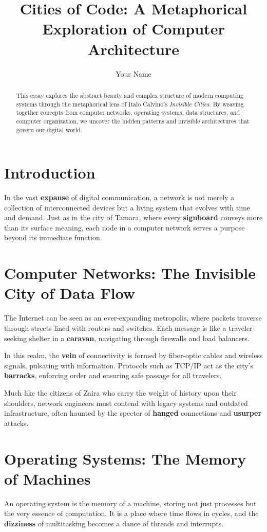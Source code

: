 \documentclass[12pt]{article}
\title{\textbf{Cities of Code: A Metaphorical Exploration of Computer Architecture}}
\author{Your Name}
\date{}
\begin{document}
	
	\maketitle
	
	\begin{abstract}
		This essay explores the abstract beauty and complex structure of modern computing systems through the metaphorical lens of Italo Calvino’s \textit{Invisible Cities}. By weaving together concepts from computer networks, operating systems, data structures, and computer organization, we uncover the hidden patterns and invisible architectures that govern our digital world.
	\end{abstract}
	
	\section{Introduction}
	In the vast \textbf{expanse} of digital communication, a network is not merely a collection of interconnected devices but a living system that evolves with time and demand. Just as in the city of Tamara, where every \textbf{signboard} conveys more than its surface meaning, each node in a computer network serves a purpose beyond its immediate function.
	
	\section{Computer Networks: The Invisible City of Data Flow}
	The Internet can be seen as an ever-expanding metropolis, where packets traverse through streets lined with routers and switches. Each message is like a traveler seeking shelter in a \textbf{caravan}, navigating through firewalls and load balancers.
	
	In this realm, the \textbf{vein} of connectivity is formed by fiber-optic cables and wireless signals, pulsating with information. Protocols such as TCP/IP act as the city's \textbf{barracks}, enforcing order and ensuring safe passage for all travelers.
	
	Much like the citizens of Zaira who carry the weight of history upon their shoulders, network engineers must contend with legacy systems and outdated infrastructure, often haunted by the specter of \textbf{hanged} connections and \textbf{usurper} attacks.
	
	\section{Operating Systems: The Memory of Machines}
	An operating system is the memory of a machine, storing not just processes but the very essence of computation. It is a place where time flows in cycles, and the \textbf{dizziness} of multitasking becomes a dance of threads and interrupts.
	
\end{document}
